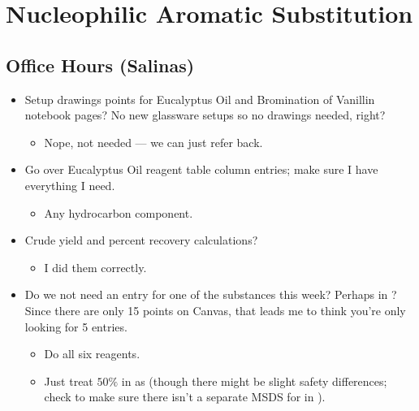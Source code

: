 \documentclass[../notes.tex]{subfiles}
\begin{document}
\chapter{Nucleophilic Aromatic Substitution}
\section{Office Hours (Salinas)}
\begin{itemize}
    \item {}Setup drawings points for Eucalyptus Oil and Bromination of Vanillin notebook pages? No new glassware setups so no drawings needed, right?
    \begin{itemize}
        \item Nope, not needed --- we can just refer back.
    \end{itemize}
    \item Go over Eucalyptus Oil reagent table column entries; make sure I have everything I need.
    \begin{itemize}
        \item Any hydrocarbon component.
    \end{itemize}
    \item Crude yield and percent recovery calculations?
    \begin{itemize}
        \item I did them correctly.
    \end{itemize}
    \item Do we not need an entry for one of the substances this week? Perhaps  in ? Since there are only 15 points on Canvas, that leads me to think you're only looking for 5 entries.
    \begin{itemize}
        \item Do all six reagents.
        \item Just treat $50\%$  in  as  (though there might be slight safety differences; check to make sure there isn't a separate MSDS for  in ).
    \end{itemize}
\end{itemize}
\end{document}
